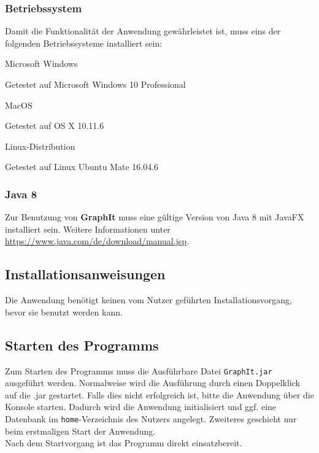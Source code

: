 \documentclass[enabledeprecatedfontcommands,fontsize=11pt,paper=a4,twoside]{scrartcl}
\newcounter{one}
\newcounter{two}[one]
\let\tempone\itemize
\let\temptwo\enditemize
\renewenvironment{itemize}{\tempone\addtolength{\itemsep}{-10.0pt}}{\temptwo}
\begin{document}
\subsubsection{Betriebssystem}
Damit die Funktionalität der Anwendung gewährleistet ist, muss eins der folgenden Betriebssysteme installiert sein:
\begin{itemize}
	\item Microsoft Windows
	\begin{itemize}
		\item Getestet auf Microsoft Windows 10 Professional
	\end{itemize}
	\item MacOS 
	\begin{itemize}
		\item Getestet auf OS X 10.11.6
	\end{itemize}
	\item Linux-Distribution
	\begin{itemize}
		 \item Getestet auf Linux Ubuntu Mate 16.04.6
	\end{itemize}
\end{itemize}
\subsubsection{Java 8}
Zur Benutzung von \textbf{GraphIt} muss eine gültige Version von Java 8 mit JavaFX installiert sein. Weitere Informationen unter \url{https://www.java.com/de/download/manual.jsp}. 

\subsection{Installationsanweisungen}
Die Anwendung benötigt keinen vom Nutzer geführten Installationsvorgang, bevor sie benutzt werden kann.

\subsection{Starten des Programms}
Zum Starten des Programms muss die Ausführbare Datei \texttt{GraphIt.jar} ausgeführt werden. Normalweise wird die Ausführung durch einen Doppelklick auf die .jar gestartet. Falls dies nicht erfolgreich ist, bitte die Anwendung über die Konsole starten. Dadurch wird die Anwendung initialisiert und ggf. eine Datenbank im \texttt{home}-Verzeichnis des Nutzers angelegt. Zweiteres geschieht nur beim erstmaligen Start der Anwendung. \\
Nach dem Startvorgang ist das Programm direkt einsatzbereit. \\
\end{document}

